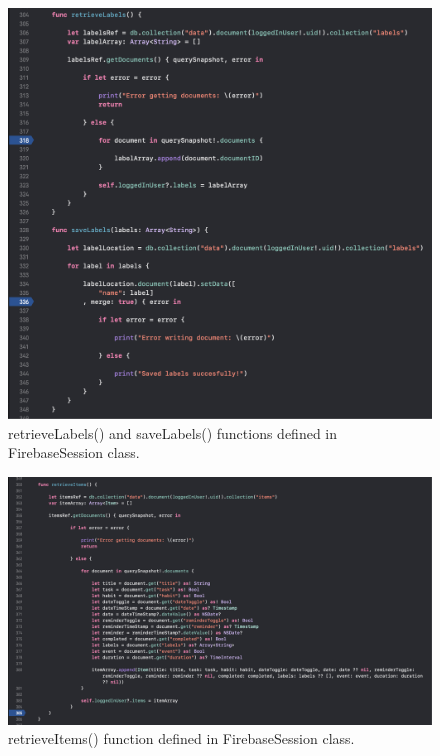 \begin{figure}[H]
    \centering
    \includegraphics[width=\textwidth]{./graphics/Implementation/Dashboard/firebasesession6.png}
    \caption{retrieveLabels() and saveLabels() functions defined in FirebaseSession class.}
    \label{fig:firebasesession6_dashboard}
\end{figure}

\begin{figure}[H]
    \centering
    \includegraphics[width=\textwidth]{./graphics/Implementation/Dashboard/firebasesession7.png}
    \caption{retrieveItems() function defined in FirebaseSession class.}
    \label{fig:firebasesession7_dashboard}
\end{figure}

